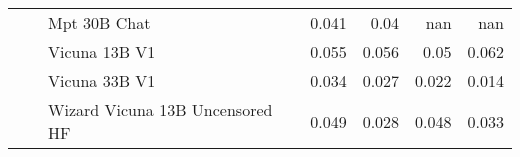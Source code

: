 \begin{table}[!htbp]
\begin{tabular}{l|l|l|rrrr}
 &  & Mpt 30B Chat & {\cellcolor[HTML]{D4E4F4}} \color[HTML]{000000} 0.041 & {\cellcolor[HTML]{D6E5F4}} \color[HTML]{000000} 0.04 & {\cellcolor[HTML]{000000}} \color[HTML]{F1F1F1} nan & {\cellcolor[HTML]{000000}} \color[HTML]{F1F1F1} nan \\
 &  & Vicuna 13B V1 & {\cellcolor[HTML]{C1D9ED}} \color[HTML]{000000} 0.055 & {\cellcolor[HTML]{BDD7EC}} \color[HTML]{000000} 0.056 & {\cellcolor[HTML]{C9DDF0}} \color[HTML]{000000} 0.05 & {\cellcolor[HTML]{B0D2E7}} \color[HTML]{000000} 0.062 \\
 &  & Vicuna 33B V1 & {\cellcolor[HTML]{DDEAF7}} \color[HTML]{000000} 0.034 & {\cellcolor[HTML]{E7F0FA}} \color[HTML]{000000} 0.027 & {\cellcolor[HTML]{EEF5FC}} \color[HTML]{000000} 0.022 & {\cellcolor[HTML]{F7FBFF}} \color[HTML]{000000} 0.014 \\
 &  & Wizard Vicuna 13B Uncensored HF & {\cellcolor[HTML]{CADEF0}} \color[HTML]{000000} 0.049 & {\cellcolor[HTML]{E6F0F9}} \color[HTML]{000000} 0.028 & {\cellcolor[HTML]{CCDFF1}} \color[HTML]{000000} 0.048 & {\cellcolor[HTML]{DFEBF7}} \color[HTML]{000000} 0.033 \\

\bottomrule
\end{tabular}
            
\end{table}

